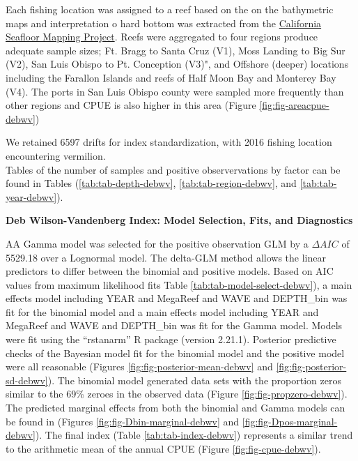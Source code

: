 \documentclass[
]{article}
\begin{document}
Each fishing location was assigned to a reef based on the on the bathymetric maps
and interpretation o hard bottom was extracted from
the \href{http://seafloor.otterlabs.org/index.html}{California Seafloor Mapping Project}.
Reefs were aggregated to four regions produce adequate sample sizes;
Ft. Bragg to Santa Cruz (V1), Moss Landing to Big Sur (V2), San Luis Obispo to
Pt. Conception (V3)", and Offshore (deeper) locations including the Farallon
Islands and reefs of Half Moon Bay and Monterey Bay (V4). The ports in San
Luis Obispo county were sampled more frequently than other regions and CPUE is
also higher in this area (Figure \ref{fig:fig-areacpue-debwv})

We retained 6597 drifts for index standardization, with
2016 fishing location encountering vermilion.\\
Tables of the number of samples and positive observervations by factor can be
found in Tables (\ref{tab:tab-depth-debwv}, \ref{tab:tab-region-debwv}, and
\ref{tab:tab-year-debwv}).

\textbf{Deb Wilson-Vandenberg Index: Model Selection, Fits, and Diagnostics}

AA Gamma model was
selected for the positive observation GLM by
a \(\Delta AIC\) of 5529.18 over a Lognormal model. The delta-GLM
method allows the linear predictors to differ between the binomial and positive models.
Based on AIC values from maximum likelihood fits Table \ref{tab:tab-model-select-debwv}),
a main effects model including
YEAR and MegaReef and WAVE and DEPTH\_bin
was fit for the binomial model and a main
effects model including
YEAR and MegaReef and WAVE and DEPTH\_bin
was fit for the Gamma model.
Models were fit using the ``rstanarm'' R package (version 2.21.1). Posterior predictive
checks of the Bayesian model fit for the binomial model and the positive model
were all reasonable (Figures \ref{fig:fig-posterior-mean-debwv} and
\ref{fig:fig-posterior-sd-debwv}). The binomial model generated data sets with the
proportion zeros similar to the 69\% zeroes in the observed data
(Figure \ref{fig:fig-propzero-debwv}). The predicted marginal effects from
both the binomial and Gamma models can be found in (Figures \ref{fig:fig-Dbin-marginal-debwv} and \ref{fig:fig-Dpos-marginal-debwv}). The
final index (Table \ref{tab:tab-index-debwv})
represents a similar trend to the arithmetic mean of the annual CPUE (Figure \ref{fig:fig-cpue-debwv}).
\end{document}
